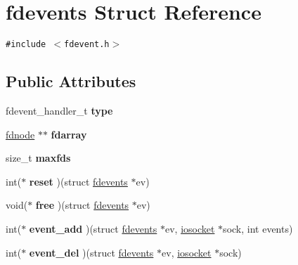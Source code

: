 \hypertarget{structfdevents}{
\section{fdevents Struct Reference}
\label{structfdevents}
}
{\tt \#include $<$fdevent.h$>$}

\subsection*{Public Attributes}
\begin{CompactItemize}
\item 
\hypertarget{structfdevents_9656b863d74046158c2feddd57b46f01}{
fdevent\_\-handler\_\-t \textbf{type}}
\label{structfdevents_9656b863d74046158c2feddd57b46f01}

\item 
\hypertarget{structfdevents_faf0c3caf9df8add00421fc912e78ad1}{
\hyperlink{struct__fdnode}{fdnode} $\ast$$\ast$ \textbf{fdarray}}
\label{structfdevents_faf0c3caf9df8add00421fc912e78ad1}

\item 
\hypertarget{structfdevents_02f9df92b0ad5e0c79c36fdb1bc8d0a5}{
size\_\-t \textbf{maxfds}}
\label{structfdevents_02f9df92b0ad5e0c79c36fdb1bc8d0a5}

\item 
\hypertarget{structfdevents_7b407184007244be141f57003a576fa0}{
int($\ast$ \textbf{reset} )(struct \hyperlink{structfdevents}{fdevents} $\ast$ev)}
\label{structfdevents_7b407184007244be141f57003a576fa0}

\item 
\hypertarget{structfdevents_ad6d8902685c90b08a721c508cb21a8a}{
void($\ast$ \textbf{free} )(struct \hyperlink{structfdevents}{fdevents} $\ast$ev)}
\label{structfdevents_ad6d8902685c90b08a721c508cb21a8a}

\item 
\hypertarget{structfdevents_4854b3245ecef3c552e8f350206453cf}{
int($\ast$ \textbf{event\_\-add} )(struct \hyperlink{structfdevents}{fdevents} $\ast$ev, \hyperlink{structiosocket}{iosocket} $\ast$sock, int events)}
\label{structfdevents_4854b3245ecef3c552e8f350206453cf}

\item 
\hypertarget{structfdevents_3f97a5a8f5b50218065d8bd05944881a}{
int($\ast$ \textbf{event\_\-del} )(struct \hyperlink{structfdevents}{fdevents} $\ast$ev, \hyperlink{structiosocket}{iosocket} $\ast$sock)}
\label{structfdevents_3f97a5a8f5b50218065d8bd05944881a}


\end{CompactItemize}
